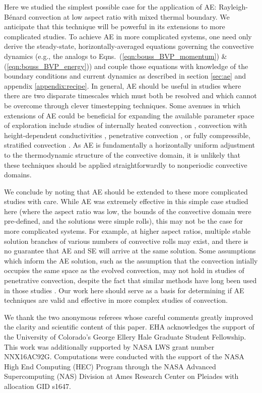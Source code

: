 \documentclass[aps, pre, onecolumn, nofootinbib, notitlepage, groupedaddress, amsfonts, amssymb, amsmath, longbibliography]{revtex4-1}
\newcommand{\RB}{Rayleigh-B\'{e}nard }
\begin{document}
Here we studied the simplest possible case for the application of AE:
\RB convection at low aspect ratio with mixed thermal boundary. 
We anticipate that
this technique will be powerful in its extensions to more complicated studies.
To achieve AE in more complicated systems, one need only derive 
the steady-state, horizontally-averaged equations governing
the convective dynamics
(e.g., the analogs to Eqns.~(\ref{eqn:bouss_BVP_momentum}) \& (\ref{eqn:bouss_BVP_energy}))
and couple those equations with knowledge of the boundary conditions
and current dynamics as described in
section \ref{sec:ae} and appendix \ref{appendix:recipe}.
In general, AE should be useful in studies where there are two disparate
timescales which must both be resolved and which cannot be overcome through
clever timestepping techniques.  Some avenues in which extensions of AE could
be beneficial for expanding the available parameter space of exploration
include studies of internally heated convection \cite{goluskin2016},
convection with height-dependent conductivities \cite{kapyla&all2017},
penetrative convection \cite{hurlburt&all1986,brandenburg&all2005,couston&all2017},
or fully compressible, stratified convection \cite{anders&brown2017}.
As AE is fundamentally a horizontally uniform adjustment to the thermodynamic
structure of the convective domain, it is unlikely that these techniques
should be applied straightforwardly to nonperiodic convective domains.

We conclude by noting that AE should be extended to these more complicated
studies with care. 
While AE was extremely effective in this simple case studied here
(where the aspect ratio was low, 
the bounds of the convective domain were pre-defined,
and the solutions were simple rolls),
this may not be the case for more complicated systems. For example, at
higher aspect ratios, multiple stable solution branches of various numbers of
convective rolls may exist, and there is no guarantee that AE and SE will
arrive at the same solution. 
Some assumptions which inform the AE solution, such as the assumption
that the convection
intially occupies the same space as the evolved convection, may not hold in
studies of penetrative convection, despite the fact that similar methods have
long been used in those studies \cite{hurlburt&all1986}.
Our work here should serve as a basis for determining if AE techniques are
valid and effective in more complex studies of convection.

\begin{acknowledgments}
We thank the two anonymous referees whose careful comments greatly 
improved the clarity and scientific content of this paper.
EHA acknowledges the support of the University of Colorado's George 
Ellery Hale Graduate Student Fellowship.
This work was additionally supported by  NASA LWS grant number NNX16AC92G.  
Computations were conducted 
with the support of the NASA High End Computing (HEC) Program through the NASA 
Advanced Supercomputing (NAS) Division at Ames Research Center on Pleiades
with allocation GID s1647.
\end{acknowledgments}
\end{document}
